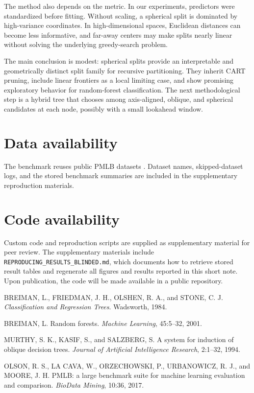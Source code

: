 \documentclass[12pt]{article}
\begin{document}
The method also depends on the metric. In our experiments, predictors were
standardized before fitting. Without scaling, a spherical split is dominated by
high-variance coordinates. In high-dimensional spaces, Euclidean distances can
become less informative, and far-away centers may make splits nearly linear
without solving the underlying greedy-search problem.

The main conclusion is modest: spherical splits provide an interpretable and
geometrically distinct split family for recursive partitioning. They inherit
CART pruning, include linear frontiers as a local limiting case, and show
promising exploratory behavior for random-forest classification. The next
methodological step is a hybrid tree that chooses among axis-aligned, oblique,
and spherical candidates at each node, possibly with a small lookahead window.

\section*{Data availability}

The benchmark reuses public PMLB datasets \citep{olson2017pmlb}. Dataset names,
skipped-dataset logs, and the stored benchmark summaries are included in the
supplementary reproduction materials.

\section*{Code availability}

Custom code and reproduction scripts are supplied as supplementary material for
peer review. The supplementary materials include
\texttt{REPRODUCING\_RESULTS\_BLINDED.md}, which documents how to retrieve
stored result tables and regenerate all figures and results reported in this
short note. Upon publication, the code will be made available in a public
repository.

\begin{thebibliography}{}

BREIMAN, L., FRIEDMAN, J. H., OLSHEN, R. A., and STONE, C. J.
\newblock \emph{Classification and Regression Trees}.
\newblock Wadsworth, 1984.

BREIMAN, L.
\newblock Random forests.
\newblock \emph{Machine Learning}, 45:5--32, 2001.

MURTHY, S. K., KASIF, S., and SALZBERG, S.
\newblock A system for induction of oblique decision trees.
\newblock \emph{Journal of Artificial Intelligence Research}, 2:1--32, 1994.

OLSON, R. S., LA CAVA, W., ORZECHOWSKI, P., URBANOWICZ, R. J., and MOORE, J. H.
\newblock PMLB: a large benchmark suite for machine learning evaluation and
comparison.
\newblock \emph{BioData Mining}, 10:36, 2017.

\end{thebibliography}
\end{document}
